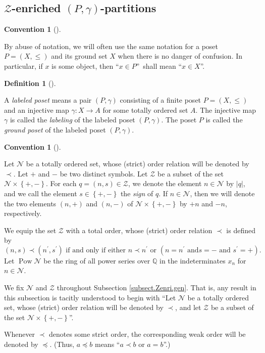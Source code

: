 \documentclass[numbers=enddot,12pt,final,onecolumn,notitlepage]{scrartcl}%
\theoremstyle{definition}
\newtheorem{defi}[theo]{Definition}
\newenvironment{definition}[1][]
{\begin{defi}[#1]\begin{leftbar}}
{\end{leftbar}\end{defi}}
\newtheorem{conv}[theo]{Convention}
\newenvironment{convention}[1][]
{\begin{conv}[#1]\begin{leftbar}}
{\end{leftbar}\end{conv}}
\newenvironment{convention}[1][Convention]{\noindent\textbf{#1.} }{\ \rule{0.5em}{0.5em}}
\begin{document}
\subsection{\label{subsect.Zenri.gen}$\mathcal{Z}$-enriched $\left(
P,\gamma\right)  $-partitions}

\begin{convention}
By abuse of notation, we will often use the same notation for a poset
$P=\left(  X,\leq\right)  $ and its ground set $X$ when there is no danger of
confusion. In particular, if $x$ is some object, then \textquotedblleft$x\in
P$\textquotedblright\ shall mean \textquotedblleft$x\in X$\textquotedblright.
\end{convention}

\begin{definition}
A \textit{labeled poset} means a pair $\left(  P,\gamma\right)  $ consisting
of a finite poset $P=\left(  X,\leq\right)  $ and an injective map
$\gamma:X\rightarrow A$ for some totally ordered set $A$. The injective map
$\gamma$ is called the \textit{labeling} of the labeled poset $\left(
P,\gamma\right)  $. The poset $P$ is called the \textit{ground poset} of the
labeled poset $\left(  P,\gamma\right)  $.
\end{definition}

\begin{convention}
Let $\mathcal{N}$ be a totally ordered set, whose (strict) order relation will
be denoted by $\prec$. Let $+$ and $-$ be two distinct symbols. Let
$\mathcal{Z}$ be a subset of the set $\mathcal{N}\times\left\{  +,-\right\}
$. For each $q=\left(  n,s\right)  \in\mathcal{Z}$, we denote the element
$n\in\mathcal{N}$ by $\left\vert q\right\vert $, and we call the element
$s\in\left\{  +,-\right\}  $ the \textit{sign} of $q$. If $n\in\mathcal{N}$,
then we will denote the two elements $\left(  n,+\right)  $ and $\left(
n,-\right)  $ of $\mathcal{N}\times\left\{  +,-\right\}  $ by $+n$ and $-n$, respectively.

We equip the set $\mathcal{Z}$ with a total order, whose (strict) order
relation $\prec$ is defined by%
\[
\left(  n,s\right)  \prec\left(  n^{\prime},s^{\prime}\right)  \text{ if and
only if either }n\prec n^{\prime}\text{ or }\left(  n=n^{\prime}\text{ and
}s=-\text{ and }s^{\prime}=+\right)  .
\]
Let $\operatorname*{Pow}\mathcal{N}$ be the ring of all power series over
$\mathbb{Q}$ in the indeterminates $x_{n}$ for $n\in\mathcal{N}$.

We fix $\mathcal{N}$ and $\mathcal{Z}$ throughout Subsection
\ref{subsect.Zenri.gen}. That is, any result in this subsection is tacitly
understood to begin with \textquotedblleft Let $\mathcal{N}$ be a totally
ordered set, whose (strict) order relation will be denoted by $\prec$, and let
$\mathcal{Z}$ be a subset of the set $\mathcal{N}\times\left\{  +,-\right\}
$\textquotedblright.

Whenever $\prec$ denotes some strict order, the corresponding weak order will
be denoted by $\preccurlyeq$. (Thus, $a \preccurlyeq b$ means ``$a \prec b$ or
$a = b$''.)
\end{convention}
\end{document}

